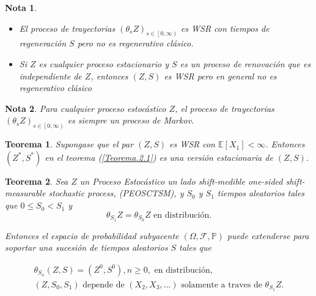 \documentclass{article}
\newtheorem{Teo}{Teorema}[section]
\newtheorem{Note}{Nota}[section]
\newcommand{\esp}{\mathbb{E}}
\newcommand{\prob}{\mathbb{P}}
\numberwithin{equation}{section}
\begin{document}
\begin{Note}
\begin{itemize}
\item El proceso de trayectorias $\left(\theta_{s}Z\right)_{s\in\left[0,\infty\right)}$ es WSR con tiempos de regeneraci\'on $S$ pero no es regenerativo cl\'asico.

\item Si $Z$ es cualquier proceso estacionario y $S$ es un proceso de renovaci\'on que es independiente de $Z$, entonces $\left(Z,S\right)$ es WSR pero en general no es regenerativo cl\'asico
\end{itemize}
\end{Note}

\begin{Note}
Para cualquier proceso estoc\'astico $Z$, el proceso de trayectorias $\left(\theta_{s}Z\right)_{s\in\left[0,\infty\right)}$ es siempre un proceso de Markov.
\end{Note}


\begin{Teo}\label{Teo.4.1}
Supongase que el par $\left(Z,S\right)$ es WSR con $\esp\left[X_{1}\right]<\infty$. Entonces $\left(Z^{*},S^{*}\right)$ en el teorema (\ref{Teorema.2.1}) es una versi\'on estacionaria de 
$\left(Z,S\right)$.
\end{Teo}

\begin{Teo}\label{Tma.Existencia.Tiempos.Regeneracion}
Sea $Z$ un Proceso Estoc\'astico un lado shift-medible \textit{one-sided shift-measurable stochastic process}, (PEOSCTSM), y $S_{0}$ y $S_{1}$ tiempos aleatorios tales que $0\leq S_{0}<S_{1}$ y
\begin{equation}
\theta_{S_{1}}Z=\theta_{S_{0}}Z\textrm{ en distribuci\'on}.
\end{equation}

Entonces el espacio de probabilidad subyacente $\left(\Omega,\mathcal{F},\prob\right)$ puede extenderse para soportar una sucesi\'on de tiempos aleatorios $S$ tales que

\begin{eqnarray}
\theta_{S_{n}}\left(Z,S\right)=\left(Z^{0},S^{0}\right),n\geq0,\textrm{ en distribuci\'on},\\
\left(Z,S_{0},S_{1}\right)\textrm{ depende de }\left(X_{2},X_{3},\ldots\right)\textrm{ solamente a traves de }\theta_{S_{1}}Z.
\end{eqnarray}
\end{Teo}
\end{document}
